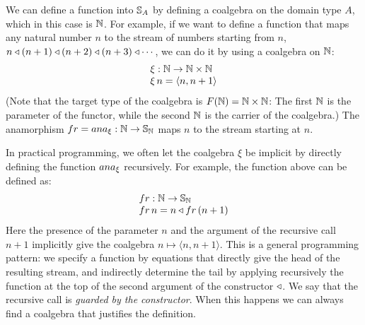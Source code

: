 We can define a function into $\mathbb{S}_{A}$ by defining a coalgebra on the domain type $A$, which in this case is $\mathbb{N}$.
For example, if we want to define a function that maps any natural number $n$ to the stream of numbers starting from $n$, $n\triangleleft (n+1) \triangleleft (n+2) \triangleleft (n+3) \triangleleft \cdots$, we can do it by using a coalgebra on $\mathbb{N}$:
$$
\begin{array}{l}
\xi : \mathbb{N} \rightarrow \mathbb{N}\times \mathbb{N}\\
\xi\,n = \langle n,n+1\rangle
\end{array}
$$
(Note that the target type of the coalgebra is $F(\mathbb{N}) = \mathbb{N}\times\mathbb{N}$: The first $\mathbb{N}$ is the parameter of the functor, while the second $\mathbb{N}$ is the carrier of the coalgebra.)
The anamorphism $\sfr = \ana{\xi}:\nat \rightarrow \stream{\nat}$ maps $n$ to the stream starting at $n$.

In practical programming, we often let the coalgebra $\xi$ be implicit by directly defining the function $\ana{\xi}$ recursively.
For example, the function above can be defined as:
$$
\begin{array}{l}
\sfr: \nat \rightarrow \stream{\nat}\\
\sfr\,n = n \scons \sfr\,(n+1)
\end{array}
$$
Here the presence of the parameter $n$ and the argument of the recursive call $n+1$ implicitly give the coalgebra $n \mapsto \langle n, n+1\rangle$.
This is a general programming pattern: we specify a function by equations that directly give the head of the resulting stream, and indirectly determine the tail
 by applying recursively the function at the top of the second argument of the constructor ${\triangleleft}$.
We say that the recursive call is {\em guarded by the constructor}.
When this happens we can always find a coalgebra that justifies the definition.

